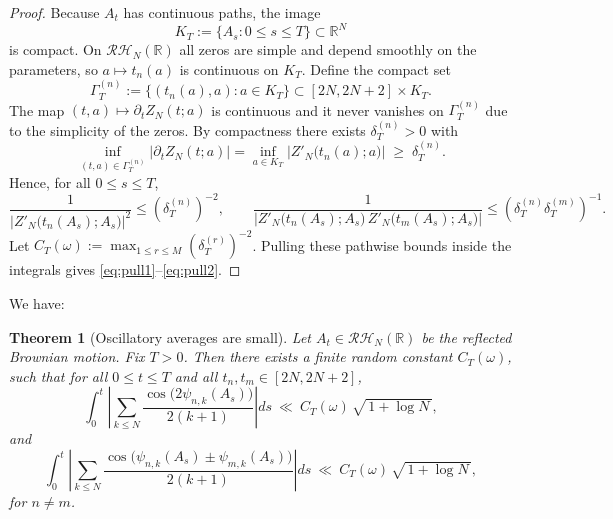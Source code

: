 \documentclass[12pt,reqno]{amsart}
\theoremstyle{plain}
\newtheorem{theorem}{Theorem}[section]
\theoremstyle{definition}
\theoremstyle{remark}
\begin{document}
\begin{proof}
Because $A_t$ has continuous paths, the image
\begin{equation}
K_T:=\{A_s:0\le s\le T\}\subset\mathbb R^N
\end{equation}
is compact.  On $\mathcal{RH}_N (\mathbb{R})$ all zeros are simple and depend smoothly on the
parameters, so $a\mapsto t_n(a)$ is continuous on $K_T$.  Define the compact set
\begin{equation}
\Gamma_T^{(n)}:=\{(t_n(a),a):a\in K_T\}\subset [2N,2N+2]\times K_T.
\end{equation}
The map $(t,a)\mapsto \partial_t Z_N(t;a)$ is continuous and it never vanishes on
$\Gamma_T^{(n)}$ due to the simplicity of the zeros.  By compactness there exists
$\delta_T^{(n)}>0$ with
\begin{equation}
\inf_{(t,a)\in\Gamma_T^{(n)}}\bigl|\partial_t Z_N(t;a)\bigr|
=\inf_{a\in K_T}\bigl|Z'_N\!\bigl(t_n(a);a\bigr)\bigr|
\;\ge\;\delta_T^{(n)}.
\end{equation}
Hence, for all $0\le s\le T$,
\begin{equation}
\frac{1}{\bigl|Z'_N\!\bigl(t_n(A_s);A_s\bigr)\bigr|^2}\le (\delta_T^{(n)})^{-2},\qquad
\frac{1}{\bigl|Z'_N\!\bigl(t_n(A_s);A_s\bigr)\,Z'_N\!\bigl(t_m(A_s);A_s\bigr)\bigr|}
\le (\delta_T^{(n)}\delta_T^{(m)})^{-1}.
\end{equation}
Let $C_T(\omega):=\max_{1\le r\le M}(\delta_T^{(r)})^{-2}$.  Pulling these
pathwise bounds inside the integrals gives \eqref{eq:pull1}–\eqref{eq:pull2}.
\end{proof}

We have:

\begin{theorem}[Oscillatory averages are small]\label{thm:Osc}
Let $A_t \in \mathcal{RH}_N(\mathbb R) $ be the reflected Brownian motion. Fix $T>0$. Then there exists a finite random constant $C_T(\omega)$, such that for all $0\le t\le T$ and all $t_n , t_m \in [2N,2N+2]$,
\begin{equation}\label{eq:osc-diag-L1}
\int_0^t \left|\sum_{k\le N}\frac{\cos \bigl(2\psi_{n,k}(A_s)\bigr)}{2(k+1)}\right| ds
\ \ll\ C_T(\omega)\,\sqrt{\,1+\log N\,},
\end{equation}
and
\begin{equation}\label{eq:osc-off-L1}
\int_0^t \left|\sum_{k\le N}\frac{\cos \bigl(\psi_{n,k}(A_s)\pm\psi_{m,k}(A_s)\bigr)}{2(k+1)}\right| ds
\ \ll\ C_T(\omega)\,\sqrt{\,1+\log N\,},
\end{equation}
for $n \neq m$.
\end{theorem}
\end{document}
